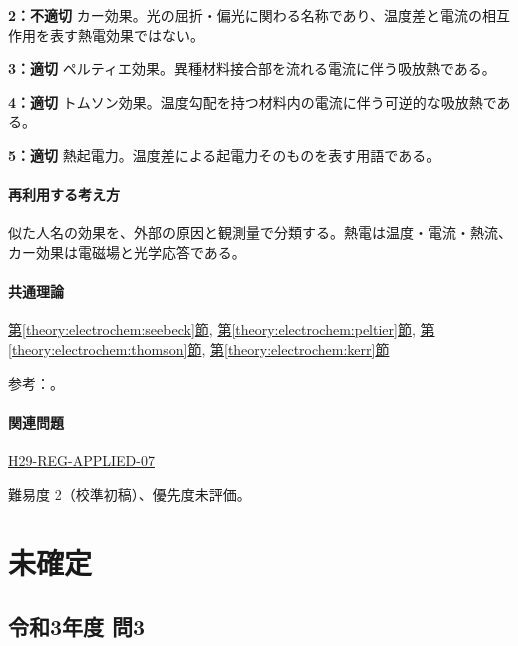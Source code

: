 \noindent\textbf{2：不適切} カー効果。光の屈折・偏光に関わる名称であり、温度差と電流の相互作用を表す熱電効果ではない。\par

\noindent\textbf{3：適切} ペルティエ効果。異種材料接合部を流れる電流に伴う吸放熱である。\par

\noindent\textbf{4：適切} トムソン効果。温度勾配を持つ材料内の電流に伴う可逆的な吸放熱である。\par

\noindent\textbf{5：適切} 熱起電力。温度差による起電力そのものを表す用語である。\par

\paragraph{再利用する考え方} 似た人名の効果を、外部の原因と観測量で分類する。熱電は温度・電流・熱流、カー効果は電磁場と光学応答である。

\paragraph{共通理論} \hyperref[theory:electrochem:seebeck]{第\ref*{theory:electrochem:seebeck}節}, \hyperref[theory:electrochem:peltier]{第\ref*{theory:electrochem:peltier}節}, \hyperref[theory:electrochem:thomson]{第\ref*{theory:electrochem:thomson}節}, \hyperref[theory:electrochem:kerr]{第\ref*{theory:electrochem:kerr}節}

\par 参考：\cite{mit_thermoelectric2024,mit_kerr_calendar2005}。

\paragraph{関連問題} \hyperref[q:h29-reg-applied-07]{H29-REG-APPLIED-07}

\par 難易度 2（校準初稿）、優先度未評価。

\section{未確定}

\subsection{令和3年度 問3}
\label{q:r03-reg-applied-03}

